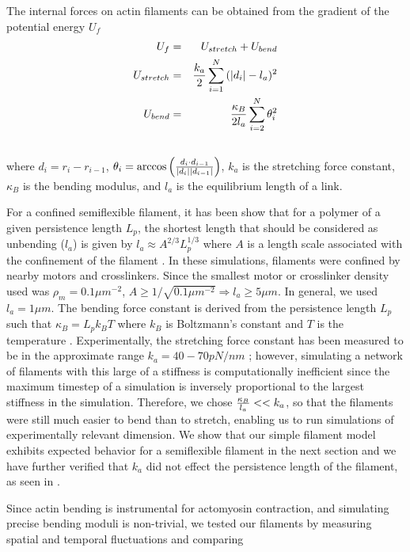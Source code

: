 \documentclass[12pt]{article} \usepackage{times} \usepackage{graphicx}
\begin{document}
The internal forces on actin filaments can be obtained from the gradient of the
potential energy $U_f$ \begin{eqnarray} U_f &=& U_{stretch} + U_{bend}\\
  U_{stretch}&=&{k_a\over2}\sum_{i=1}^{N}{(|d_i| - l_a)^2}\\\nonumber
  U_{bend}&=&{\kappa_B\over 2l_a}\sum_{i=2}^N{\theta_i^2}\\\nonumber
  \label{eqn:Ufil} \end{eqnarray} where $d_i = r_i-r_{i-1}$, $\theta_i =
\arccos{\left({d_i\cdot d_{i-1}\over |d_i||d_{i-1}|}\right)}$, $k_a$ is the
stretching force constant, $\kappa_B$ is the bending modulus, and $l_a$ is the
equilibrium length of a link.  \par For a confined semiflexible filament, it
has been show that for a polymer of a given persistence length $L_p$, the
shortest length that should be considered as unbending ($l_a$) is given by
$l_a\approx A^{2/3}L_p^{1/3}$ where $A$ is a length scale associated with the
confinement of the filament \cite{odijk1983}. In these simulations, filaments
were confined by nearby motors and crosslinkers. Since the smallest motor or
crosslinker density used was $\rho_m=0.1\mu m^{-2}$, $A\ge1/\sqrt{0.1\mu
  m^{-2}}\Rightarrow l_a\ge5\mu m$. In general, we used $l_a=1\mu m$.  The
  bending force constant is derived from the persistence length $L_p$ such that
  $\kappa_B = L_p k_B T$ where $k_B$ is Boltzmann's constant and $T$ is the
  temperature \cite{rubinstein}. Experimentally, the stretching force constant
  has been measured to be in the approximate range $k_a=40-70pN/nm$
  \cite{kojima1994, higuchi1995}; however, simulating a network of filaments
  with this large of a stiffness is computationally inefficient since the
  maximum timestep of a simulation is inversely proportional to the largest
  stiffness in the simulation. Therefore, we chose ${\kappa_B\over l_a} <<k_a$,
  so that the filaments were still much easier to bend than to stretch,
  enabling us to run simulations of experimentally relevant dimension. We show
  that our simple filament model exhibits expected behavior for a semiflexible
  filament in the next section and we have further verified that $k_a$ did not
  effect the persistence length of the filament, as seen in
  .  \par Since actin bending is instrumental for actomyosin
  contraction, and simulating precise bending moduli is non-trivial, we tested
  our filaments by measuring spatial and temporal fluctuations and comparing
\end{document}
